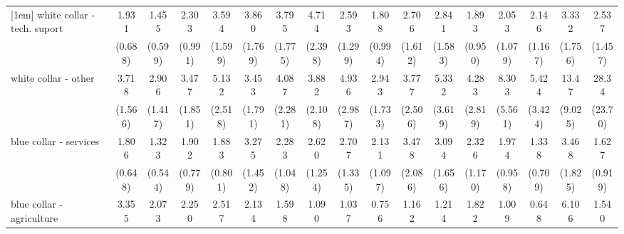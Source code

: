 {\begin{tabular}{l*{16}{c}}
[1em]
white collar - tech. suport&       1.931         &       1.455         &       2.303         &       3.594\sym{**} &       3.860\sym{**} &       3.795\sym{**} &       4.714\sym{**} &       2.593         &       1.808         &       2.706         &       2.841         &       1.893         &       2.053         &       2.146         &       3.332\sym{*}  &       2.537         \\
                    &     (0.688)         &     (0.599)         &     (0.991)         &     (1.599)         &     (1.769)         &     (1.775)         &     (2.398)         &     (1.299)         &     (0.994)         &     (1.612)         &     (1.583)         &     (0.950)         &     (1.079)         &     (1.167)         &     (1.756)         &     (1.457)         \\
[1em]
white collar - other&       3.718\sym{**} &       2.906\sym{*}  &       3.477\sym{*}  &       5.132\sym{***}&       3.453\sym{*}  &       4.087\sym{*}  &       3.882\sym{*}  &       4.936\sym{**} &       2.943         &       3.777\sym{*}  &       5.332\sym{*}  &       4.283\sym{*}  &       8.303\sym{**} &       5.424\sym{**} &       13.47\sym{***}&       28.34\sym{***}\\
                    &     (1.566)         &     (1.417)         &     (1.851)         &     (2.518)         &     (1.791)         &     (2.281)         &     (2.108)         &     (2.987)         &     (1.733)         &     (2.506)         &     (3.619)         &     (2.819)         &     (5.561)         &     (3.424)         &     (9.025)         &     (23.70)         \\
[1em]
blue collar - services&       1.806         &       1.323         &       1.902         &       1.883         &       3.275\sym{**} &       2.283         &       2.620\sym{*}  &       2.707\sym{*}  &       2.131         &       3.478\sym{*}  &       3.094\sym{*}  &       2.326         &       1.974         &       1.338         &       3.468\sym{*}  &       1.627         \\
                    &     (0.648)         &     (0.544)         &     (0.779)         &     (0.801)         &     (1.452)         &     (1.048)         &     (1.254)         &     (1.335)         &     (1.097)         &     (2.086)         &     (1.656)         &     (1.170)         &     (0.958)         &     (0.709)         &     (1.825)         &     (0.919)         \\
[1em]
blue collar - agriculture&       3.355\sym{*}  &       2.073         &       2.250         &       2.517         &       2.134         &       1.598         &       1.090         &       1.037         &       0.756         &       1.162         &       1.214         &       1.822         &       1.009         &       0.648         &       6.106\sym{*}  &       1.540         \\

\end{tabular}}
